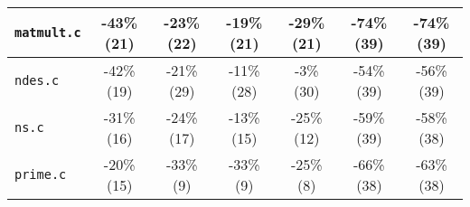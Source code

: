 \begin{tabular}{ |l| |c|c|c|c| |c|c| }
  \\\hline
  \verb|matmult.c|
  & -43\% (21) & -23\% (22) & -19\% (21) & -29\% (21)
  & -74\% (39) & -74\% (39)

  \\\hline
  \verb|ndes.c|
  & -42\% (19) & -21\% (29) & -11\% (28) & -3\% (30)
  & -54\% (39) & -56\% (39)

  \\\hline
  \verb|ns.c|
  & -31\% (16) & -24\% (17) & -13\% (15) & -25\% (12)
  & -59\% (39) & -58\% (38)

  \\\hline
  \verb|prime.c|
  & -20\% (15) & -33\% (9) & -33\% (9) & -25\% (8)
  & -66\% (38) & -63\% (38)

  \\\hline
\end{tabular}

